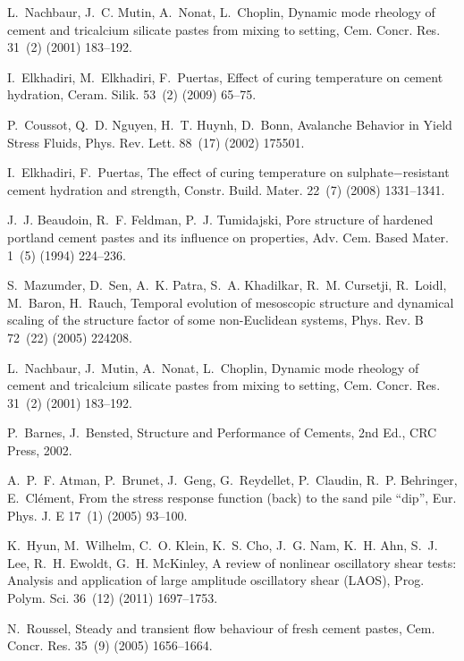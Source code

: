 \documentclass[final,5p,twocolumn]{elsarticle}
\begin{document}
L.~Nachbaur, J.~C. Mutin, A.~Nonat, L.~Choplin, Dynamic mode rheology of cement
  and tricalcium silicate pastes from mixing to setting, Cem. Concr. Res.
  31~(2) (2001) 183--192.

I.~Elkhadiri, M.~Elkhadiri, F.~Puertas, Effect of curing temperature on cement
  hydration, Ceram. Silik. 53~(2) (2009) 65--75.

P.~Coussot, Q.~D. Nguyen, H.~T. Huynh, D.~Bonn, Avalanche {Behavior} in {Yield}
  {Stress} {Fluids}, Phys. Rev. Lett. 88~(17) (2002) 175501.

I.~Elkhadiri, F.~Puertas, The effect of curing temperature on
  sulphate$-$resistant cement hydration and strength, Constr. Build. Mater.
  22~(7) (2008) 1331--1341.

J.~J. Beaudoin, R.~F. Feldman, P.~J. Tumidajski, Pore structure of hardened
  portland cement pastes and its influence on properties, Adv. Cem. Based
  Mater. 1~(5) (1994) 224--236.

S.~Mazumder, D.~Sen, A.~K. Patra, S.~A. Khadilkar, R.~M. Cursetji, R.~Loidl,
  M.~Baron, H.~Rauch, Temporal evolution of mesoscopic structure and dynamical
  scaling of the structure factor of some non-{Euclidean} systems, Phys. Rev. B
  72~(22) (2005) 224208.

L.~Nachbaur, J.~Mutin, A.~Nonat, L.~Choplin, Dynamic mode rheology of cement
  and tricalcium silicate pastes from mixing to setting, Cem. Concr. Res.
  31~(2) (2001) 183--192.

P.~Barnes, J.~Bensted, Structure and {Performance} of {Cements}, {2nd}
  {Ed.}, CRC Press, 2002.

A.~P.~F. Atman, P.~Brunet, J.~Geng, G.~Reydellet, P.~Claudin, R.~P. Behringer,
  E.~Cl\'ement, From the stress response function (back) to the sand pile
  ``dip'', Eur. Phys. J. E 17~(1) (2005) 93--100.

K.~Hyun, M.~Wilhelm, C.~O. Klein, K.~S. Cho, J.~G. Nam, K.~H. Ahn, S.~J. Lee,
  R.~H. Ewoldt, G.~H. McKinley, A review of nonlinear oscillatory shear tests:
  {Analysis} and application of large amplitude oscillatory shear ({LAOS}),
  Prog. Polym. Sci. 36~(12) (2011) 1697--1753.

N.~Roussel, Steady and transient flow behaviour of fresh cement pastes, Cem.
  Concr. Res. 35~(9) (2005) 1656--1664.
\end{document}
